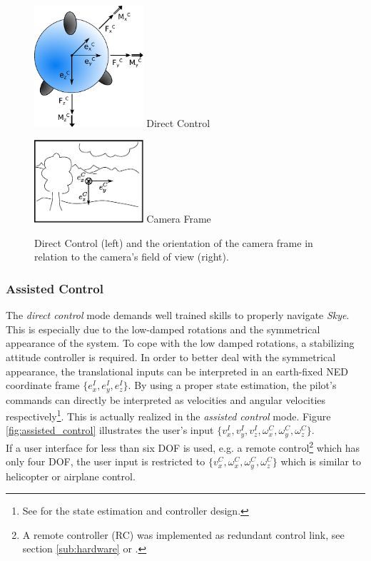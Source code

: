 \begin{figure}[H]		
	\small{
		\begin{center}
			\parbox{0.36\textwidth}{\centering \includegraphics[width=0.36\textwidth]{DC}
			 Direct Control}
			\hspace{0.1\textwidth}			
			\parbox{0.36\textwidth}{\centering \includegraphics[width=0.36\textwidth]{CameraFrame}
			Camera Frame}
	\caption[Direct Control]{Direct Control (left) and the orientation of the camera frame in relation to the camera's field of view (right).}
		\label{fig:direct_control}
		\end{center}
	}			
	\vspace{4.5mm}
\end{figure}


\subsubsection{Assisted Control} 
The \textit{direct control} mode demands well trained skills to properly navigate \textit{Skye}. This is especially due to the low-damped rotations \cite{weichart} and the symmetrical appearance of the system. To cope with the low damped rotations, a stabilizing attitude controller is required. In order to better deal with the symmetrical appearance, the translational inputs can be interpreted in an earth-fixed NED coordinate frame $\{e_x^I, e_y^I, e_z^I\}$. By using a proper state estimation, the pilot's commands can directly be interpreted as velocities and angular velocities respectively\footnote{See \cite{meiermueri} for the state estimation and controller design.}. This is actually realized in the \textit{assisted control} mode. Figure \ref{fig:assisted_control} illustrates the user's input $\{v_x^I, v_y^I, v_z^I, \omega_x^C, \omega_y^C, \omega_z^C\}$. \\
If a user interface for less than six DOF is used, e.g. a remote control\footnote{A remote controller (RC) was implemented as redundant control link, see section \ref{sub:hardware} or \cite{burri}.} which has only four DOF, the user input is restricted to $\{v_x^C, \omega_x^C, \omega_y^C, \omega_z^C\}$ which is similar to helicopter or airplane control.

